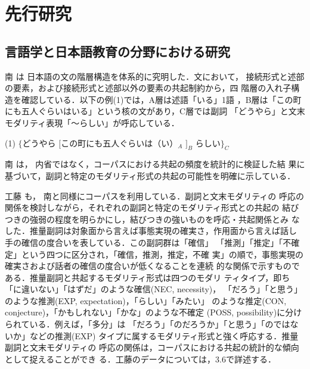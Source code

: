 \documentclass[japanese]{jnlp_1.4}
\begin{document}
\section{先行研究}

\subsection{言語学と日本語教育の分野における研究}

    南 \citeyear{Minami1,Minami2}は
日本語の文の階層構造を体系的に究明した．文において，
接続形式と述部の要素，および接続形式と述部以外の要素の共起制約から，四
階層の入れ子構造を確認している．以下の例(1)では，A層は述語「いる」1語
，B層は「この町にも五人ぐらいはいる」という核の文があり，C層では副詞
「どうやら」と文末モダリティ表現「〜らしい」が呼応している．

\vspace{0.5\baselineskip}
\begin{description}
\item{(1)} $\{$どうやら $[$この町にも五人ぐらいは（い）$_A$ $]_B$
らしい$\}_C$ \hspace{4zw} \cite{Bekes}
\end{description}
\vspace{0.5\baselineskip}

    南 \citeyear{Minami1}は，
内省ではなく，コーパスにおける共起の頻度を統計的に検証した結
果に基づいて，副詞と特定のモダリティ形式の共起の可能性を明確に示している．

    工藤 \citeyear{Kudou}も，
南と同様にコーパスを利用している．副詞と文末モダリティの
呼応の関係を検討しながら，それぞれの副詞と特定のモダリティ形式との共起の
結びつきの強弱の程度を明らかにし，結びつきの強いものを呼応・共起関係とみ
なした．推量副詞は対象面から言えば事態実現の確実さ，作用面から言えば話し
手の確信の度合いを表している\cite[p.~204，5]{Kudou}．この副詞群は「確信」
「推測」「推定」「不確定」という四つに区分され，「確信，推測，推定，不確
実」の順で，事態実現の確実さおよび話者の確信の度合いが低くなることを連続
的な関係で示すものである．推量副詞と共起するモダリティ形式は四つのモダリ
ティタイプ，即ち「に違いない」「はずだ」のような確信(NEC, necessity)，
「だろう」「と思う」のような推測(EXP, expectation)，「らしい」「みたい」
のような推定(CON, conjecture)，「かもしれない」「かな」のような不確定
(POSS, possibility)に分けられている\cite[p.~203]{Kudou}．例えば，「多分」は
「だろう」「のだろうか」「と思う」「のではないか」などの推測(EXP)
タイプに属するモダリティ形式と強く呼応する．推量副詞と文末モダリティの
呼応の関係は，コーパスにおける共起の統計的な傾向として捉えることができ
る．工藤のデータについては，3.6で詳述する．
\end{document}
